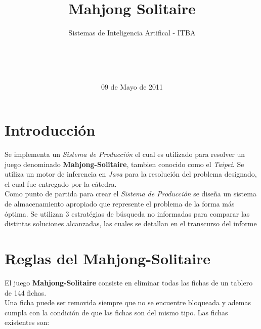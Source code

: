 \documentclass{sig-alternate}
\begin{document}

\title{Mahjong Solitaire}
\subtitle{Sistemas de Inteligencia Artifical - ITBA}


\author{
	\\
	\\
	\\
}

\date{09 de Mayo de 2011}

\maketitle

\section*{Introducci\'on}
	Se implementa un \textit{Sistema de Producci\'on} el cual es utilizado para resolver un juego denominado \textbf{Mahjong-Solitaire}, tambien conocido como el \textit{Taipei}. Se utiliza un motor de inferencia en \textit{Java} para la resoluci\'on del problema designado, el cual fue entregado por la c\'atedra. \\
	Como punto de partida para crear el \textit{Sistema de Producci\'on} se dise\~{n}a un sistema de almacenamiento apropiado que represente el problema de la forma m\'as \'optima. Se utilizan 3 estrat\'egias de b\'usqueda no informadas para comparar las distintas soluciones alcanzadas, las cuales se detallan en el transcurso del informe

\section*{Reglas del Mahjong-Solitaire}
	El juego \textbf{Mahjong-Solitaire} consiste en eliminar todas las fichas de un tablero de 144 fichas. \\
	Una ficha puede ser removida siempre que no se encuentre bloqueada y ademas cumpla con la condici\'on de que las fichas son del mismo tipo. Las fichas existentes son:
\end{document}
